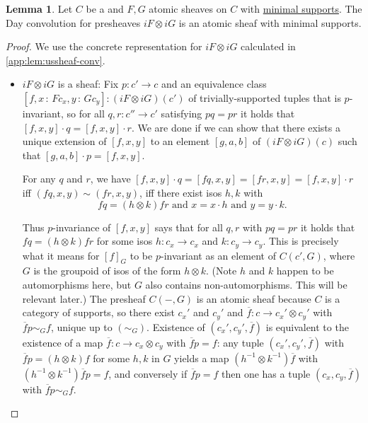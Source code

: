 \documentclass[
  sigconf,
  screen, ]{acmart}
\theoremstyle{definition}
\newtheorem{lemma}[theorem]{Lemma}
\newcommand\ofty{\,{:}\,}
\newcommand\nref[2]{\hyperref[#1]{#2}} \newcommand\checkhigh{{\huge{\color{red}\textbf{TODO: check}}}}
\begin{document}
\begin{lemma} \label{app:lem:tensor-preserves-ussheaves}
  Let $C$ be a 
  and $F,G$ atomic sheaves on $C$ with \nref{app:def:supported-sheaf}{minimal supports}.
  The Day convolution for presheaves $iF\otimes iG$
  is an atomic sheaf with minimal supports.
\end{lemma}
\begin{proof}
  We use the concrete representation for $iF\otimes iG$
  calculated in \cref{app:lem:ussheaf-conv}.
  \begin{itemize}
    \item $iF\otimes iG$ is a sheaf:
    Fix $p :  c'\to  c$
    and an equivalence class
     $[f, x\ofty F c_x, y \ofty G c_y] : (iF\otimes iG)( c')$
     of trivially-supported tuples
    that is $p$-invariant, so
    for all 
    $q,r :  c''\to c'$
    satisfying $pq = pr$ it holds that
    $[f,x,y]\cdot q = [f,x,y]\cdot r$.
    We are done if we can show that there exists a unique
    extension of $[f,x,y]$ to an element $[g,a,b]$ of $(iF\otimes iG)( c)$
    such that $[g,a,b]\cdot p = [f,x,y]$.
  
    For any $q$ and $r$, we have $[f,x,y] \cdot q= [fq,x,y] = [fr,x,y] = [f,x,y]\cdot r$
    iff $(fq,x,y)\sim (fr,x,y)$, iff there exist isos $h,k$
    with
    \[ \text{$fq = (h\otimes k)fr$ and $x = x\cdot h$ and $y = y\cdot k$}. \]

    Thus $p$-invariance of $[f,x,y]$ says that for all $q,r$
    with $pq=pr$ it holds that $fq = (h\otimes k)fr$
    for some isos $h :  c_x\to c_x$ and $k: c_y\to c_y$.
    This is precisely what it means for $[f]_G$
    to be $p$-invariant as an element of $ C( c',G)$,
    where $G$ is the groupoid of isos of the form $h\otimes k$.
    (Note $h$ and $k$ happen to be automorphisms
    here, but $G$ also contains non-automorphisms.
    This will be relevant later.)
    The presheaf $C(-,G)$ is an atomic sheaf
    because $C$ is a category of supports, so
    there exist
    $ c_x'$ and $ c_y'$
    and $\overline f :  c\to  c_x'\otimes  c_y'$
    with $\overline f p \sim_G f$,
    unique up to $(\sim_G)$.
    Existence of $( c_x', c_y',\overline f)$
    is equivalent to the existence of a map $\overline f :  c\to c_x\otimes c_y$
    with $\overline f p = f$:
    any tuple $(c_x',c_y',\overline f)$ with $\overline f p = (h\otimes k)f$
    for some $h,k$ in $G$ yields a map
    $(h^{-1}\otimes k^{-1})\overline f$
    with $(h^{-1}\otimes k^{-1})\overline f p = f$,
    and conversely if $\overline f p = f$
    then one has a tuple $(c_x,c_y,\overline f)$ with $\overline f p \sim_G f$.


\end{itemize}
\end{proof}
\end{document}
